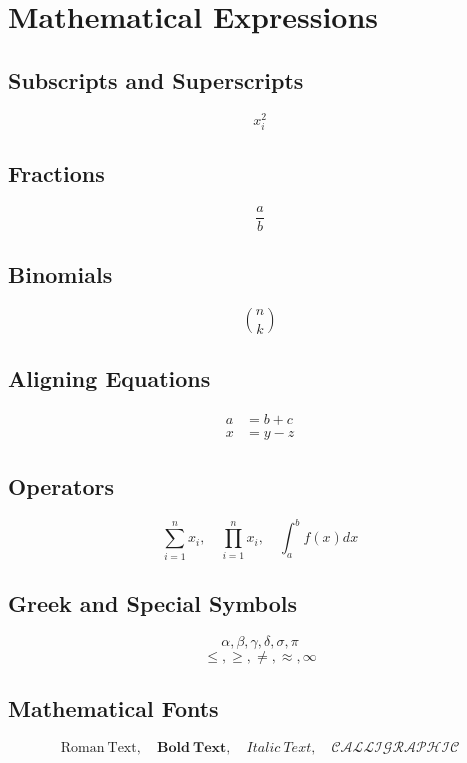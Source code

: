 \documentclass{article}
\begin{document}
\section{Mathematical Expressions}

\subsection{Subscripts and Superscripts}
\[ x_{i}^{2} \]

\subsection{Fractions}
\[ \frac{a}{b} \]

\subsection{Binomials}
\[ \binom{n}{k} \]

\subsection{Aligning Equations}
\begin{align}
    a &= b + c \\
    x &= y - z
\end{align}

\subsection{Operators}
\[ \sum_{i=1}^{n} x_{i}, \quad \prod_{i=1}^{n} x_{i}, \quad \int_{a}^{b} f(x) dx \]

\subsection{Greek and Special Symbols}
\[ \alpha, \beta, \gamma, \delta, \sigma, \pi \]
\[ \leq, \geq, \neq, \approx, \infty \]

\subsection{Mathematical Fonts}
\[ \mathrm{Roman\ Text}, \quad \mathbf{Bold\ Text}, \quad \mathit{Italic\ Text}, \quad \mathcal{CALLIGRAPHIC} \]
\end{document}
